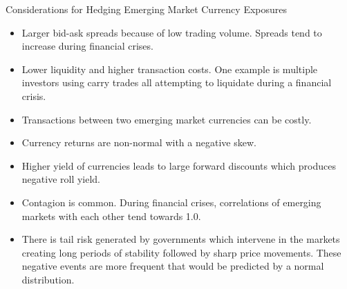\documentclass[../custom]{flashcards}
\newcommand{\studyArea}{Risk Management}
\begin{document}
\begin{flashcard}[\studyArea]{Considerations for Hedging Emerging Market Currency Exposures}
    \begin{itemize}
        \item Larger bid-ask spreads because of low trading volume. Spreads tend to increase during financial crises.
        \item Lower liquidity and higher transaction costs. One example is multiple investors using carry trades all attempting to liquidate during a financial crisis.
        \item Transactions between two emerging market currencies can be costly.
        \item Currency returns are non-normal with a negative skew.
        \item Higher yield of currencies leads to large forward discounts which produces negative roll yield.
        \item Contagion is common. During financial crises, correlations of emerging markets with each other tend towards 1.0.
        \item There is tail risk generated by governments which intervene in the markets creating long periods of stability followed by sharp price movements. These negative events are more frequent that would be predicted by a normal distribution.
    \end{itemize}
\end{flashcard}
\end{document}
